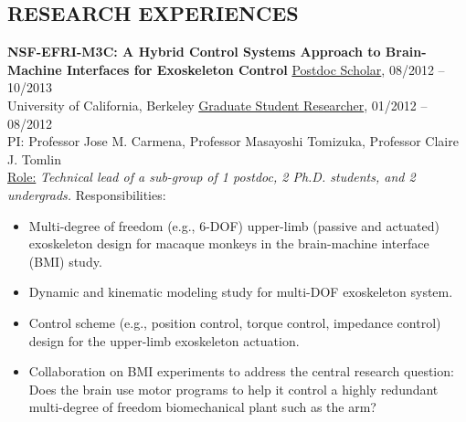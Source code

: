 \documentclass{res}
\begin{document}
\begin{resume}
\section{RESEARCH EXPERIENCES}
\vspace{0.1in}
{\bf NSF-EFRI-M3C: A Hybrid Control Systems Approach to Brain-Machine Interfaces for Exoskeleton Control}
\hfill  \underline{Postdoc Scholar}, 08/2012 -- 10/2013\\
University of California, Berkeley \hfill \underline{Graduate Student Researcher}, 01/2012 -- 08/2012\\
PI: Professor Jose M. Carmena, Professor Masayoshi Tomizuka, Professor Claire J. Tomlin \\
\underline{Role:} \emph{Technical lead of a sub-group of 1 postdoc, 2 Ph.D. students, and 2 undergrads.} Responsibilities:%
\begin{itemize}
	\item Multi-degree of freedom (e.g., 6-DOF) upper-limb (passive and actuated) exoskeleton design for macaque monkeys in the brain-machine interface (BMI) study.
	\item Dynamic and kinematic modeling study for multi-DOF exoskeleton system.
	\item Control scheme (e.g., position control, torque control, impedance control) design for the upper-limb exoskeleton actuation.
	\item Collaboration on BMI experiments to address the central research question: Does the brain use motor programs to help it control a highly redundant multi-degree of freedom biomechanical plant such as the arm?
\end{itemize}


\end{resume}
\end{document}
